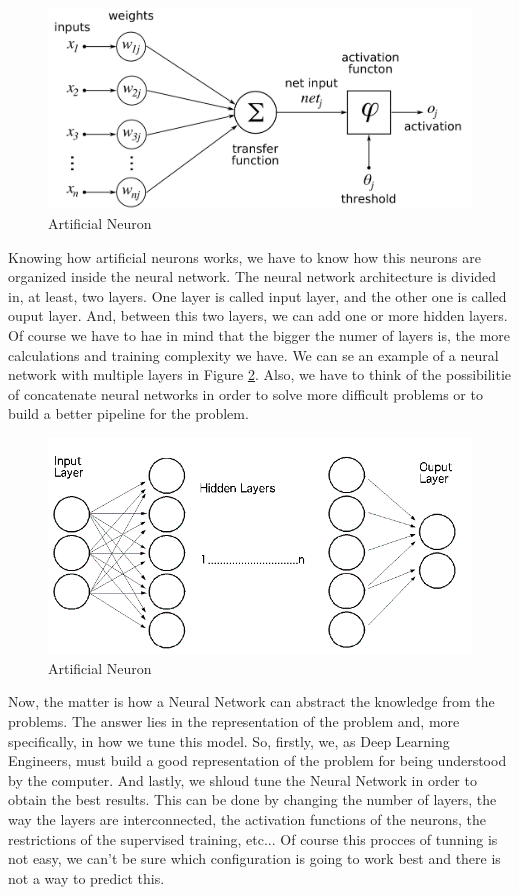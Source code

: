 \documentclass[12pt]{article}
\begin{document}
\begin{figure}[ht]
\centering
\includegraphics[width=.6\textwidth]{Neuron.png}
\caption{Artificial Neuron}
\label{fig:figure1}
\end{figure}

Knowing how artificial neurons works, we have to know how this neurons are organized inside the neural network. The neural network architecture is divided in, at least, two layers. One layer is called input layer, and the other one is called ouput layer. And, between this two layers, we can add one or more hidden layers. Of course we have to hae in mind that the bigger the numer of layers is, the more calculations and training complexity we have. We can se an example of a neural network with multiple layers in Figure \ref{fig:figure2}. Also, we have to think of the possibilitie of concatenate neural networks in order to solve more difficult problems or to build a better pipeline for the problem.

\begin{figure}[ht]
\centering
\includegraphics[width=.6\textwidth]{network.png}
\caption{Artificial Neuron}
\label{fig:figure2}
\end{figure}

Now, the matter is how a Neural Network can abstract the knowledge from the problems. The answer lies in the representation of the problem and, more specifically, in how we tune this model. So, firstly, we, as Deep Learning Engineers, must build a good representation of the problem for being understood by the computer. And lastly, we shloud tune the Neural Network in order to obtain the best results. This can be done by changing the number of layers, the way the layers are interconnected, the activation functions of the neurons, the restrictions of the supervised training, etc... Of course this procces of tunning is not easy, we can't be sure which configuration is going to work best and there is not a way to predict this.
\end{document}
